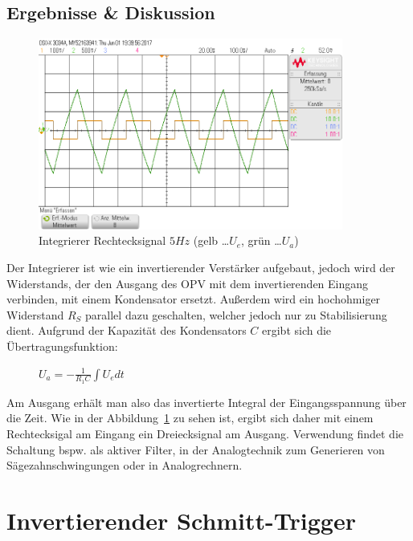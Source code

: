 \documentclass[12pt,a4paper,titlepage]{article}
\begin{document}
\subsection*{Ergebnisse \& Diskussion}
\begin{figure}[H]
  \centering
  \includegraphics[width=100mm]{integrierer_rechtecksignal_eingang_ausgang.png}
  \caption{Integrierer Rechtecksignal $5Hz$ (gelb \dots $U_e$, gr\"un \dots $U_a$)}
  \label{figure32}
\end{figure}
Der Integrierer ist wie ein invertierender Verst\"arker aufgebaut, jedoch wird der Widerstands, der den Ausgang des OPV mit dem invertierenden Eingang verbinden, mit einem Kondensator ersetzt. Au\ss erdem wird ein hochohmiger Widerstand $R_S$ parallel dazu geschalten, welcher jedoch nur zu Stabilisierung dient. Aufgrund der Kapazit\"at des Kondensators $C$ ergibt sich die \"Ubertragungsfunktion:
\begin{figure}[H]
\centering
$U_a = - \frac{1}{R_1C} \int U_e dt$
\end{figure}
\noindent Am Ausgang erh\"alt man also das invertierte Integral der Eingangsspannung \"uber die Zeit. Wie in der Abbildung~\ref{figure32} zu sehen ist, ergibt sich daher mit einem Rechtecksigal am Eingang ein Dreiecksignal am Ausgang. Verwendung findet die Schaltung bspw. als aktiver Filter, in der Analogtechnik zum Generieren von S\"agezahnschwingungen oder in Analogrechnern.



\section{Invertierender Schmitt-Trigger}

\end{document}
